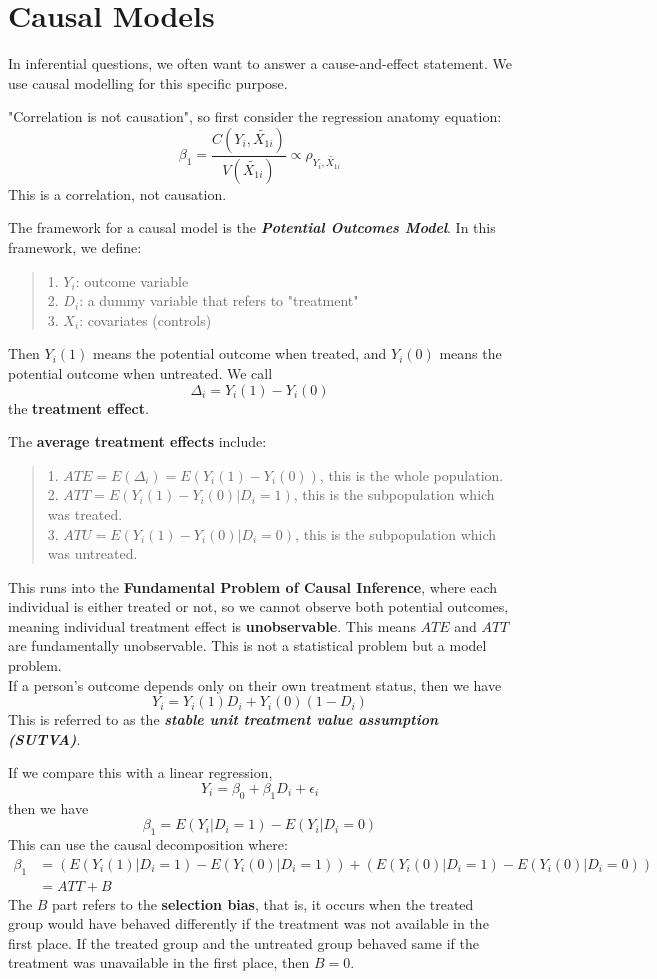\section{Causal Models}
In inferential questions, we often want to answer a cause-and-effect statement. We use causal modelling for this specific purpose.

"Correlation is not causation", so first consider the regression anatomy equation:
$$\beta_1 = \frac{C(Y_i, \tilde{X_{1i}})}{V(\tilde{X_{1i}})} \propto \rho_{Y_i, \tilde{X_{1i}}}$$
This is a correlation, not causation.

The framework for a causal model is the \textbf{\textit{Potential Outcomes Model}}. In this framework, we define:
\begin{quote}
    1. $Y_i$: outcome variable \\
    2. $D_i$: a dummy variable that refers to "treatment" \\
    3. $X_i$: covariates (controls)
\end{quote}
Then $Y_i(1)$ means the potential outcome when treated, and $Y_i(0)$ means the potential outcome when untreated. We call
$$\Delta_i = Y_i(1) - Y_i(0)$$
the \textbf{treatment effect}.

The \textbf{average treatment effects} include:
\begin{quote}
    1. $ATE = E(\Delta_i) = E(Y_i(1) - Y_i(0))$, this is the whole population. \\
    2. $ATT = E(Y_i(1) - Y_i(0) | D_i = 1)$, this is the subpopulation which was treated. \\
    3. $ATU = E(Y_i(1) - Y_i(0) | D_i = 0)$, this is the subpopulation which was untreated.
\end{quote}
This runs into the \textbf{Fundamental Problem of Causal Inference}, where each individual is either treated or not, so we cannot observe both potential outcomes, meaning individual treatment effect is \textbf{unobservable}. This means $ATE$ and $ATT$ are fundamentally unobservable. This is not a statistical problem but a model problem. \\
If a person's outcome depends only on their own treatment status, then we have
$$Y_i = Y_i(1)D_i + Y_i(0)(1-D_i)$$
This is referred to as the \textbf{\textit{stable unit treatment value assumption (SUTVA)}}.

If we compare this with a linear regression,
$$Y_i = \beta_0 + \beta_1 D_i + \epsilon_i$$
then we have
$$\beta_1 = E(Y_i | D_i = 1) - E(Y_i | D_i = 0)$$
This can use the causal decomposition where:
\begin{align*}
    \beta_1 &= (E(Y_i(1) | D_i = 1) - E(Y_i(0) | D_i = 1)) + (E(Y_i(0) | D_i = 1) - E(Y_i(0) | D_i = 0)) \\
    &= ATT + B
\end{align*}
The $B$ part refers to the \textbf{selection bias}, that is, it occurs when the treated group would have behaved differently if the treatment was not available in the first place. If the treated group and the untreated group behaved same if the treatment was unavailable in the first place, then $B = 0$.

